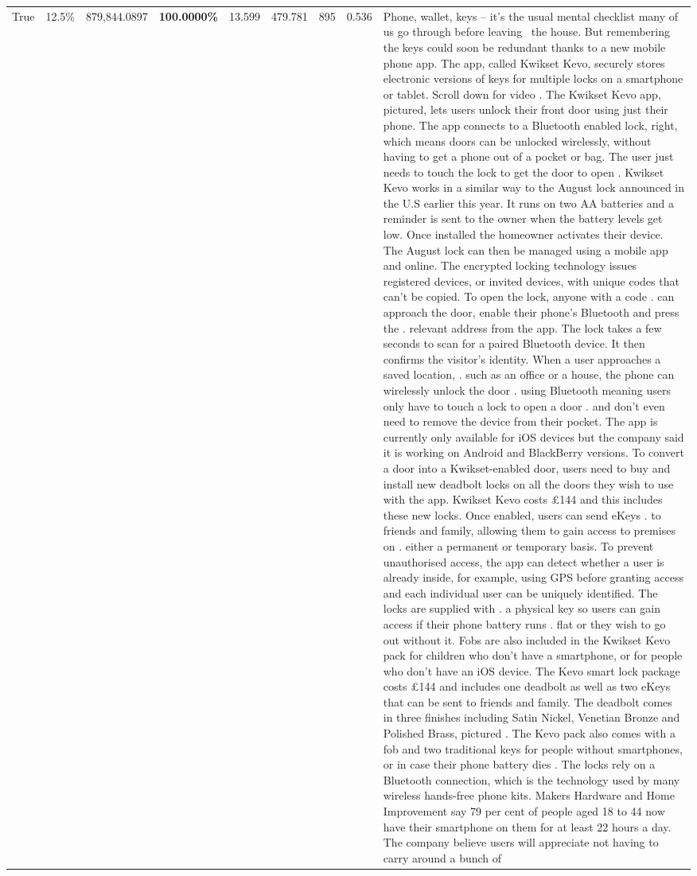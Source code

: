 \begin{table}[H]
\begin{tabular}{lllrlllll}
True & 12.5\% & 879,844.0897 & \bfseries \color{red} 100.0000\% & 13.599 & 479.781 & 895 & 0.536 & Phone, wallet, keys – it’s the usual mental checklist many of us go through before leaving  the house. But remembering the keys could soon be redundant thanks to a new mobile phone app. The app, called Kwikset Kevo, securely stores electronic versions of keys for multiple locks on a smartphone or tablet. Scroll down for video . The Kwikset Kevo app, pictured, lets users unlock their front door using just their phone. The app connects to a Bluetooth enabled lock, right, which means doors can be unlocked wirelessly, without having to get a phone out of a pocket or bag. The user just needs to touch the lock to get the door to open . Kwikset Kevo works in a similar way to the August lock announced in the U.S earlier this year. It runs on two AA batteries and a reminder is sent to the owner when the battery levels get low. Once installed the homeowner activates their device. The August lock can then be managed using a mobile app and online. The encrypted locking technology issues registered devices, or invited devices, with unique codes that can't be copied. To open the lock, anyone with a code . can approach the door, enable their phone's Bluetooth and press the . relevant address from the app. The lock takes a few seconds to scan for a paired Bluetooth device. It then confirms the visitor's identity. When a user approaches a saved location, . such as an office or a house, the phone can wirelessly unlock the door . using Bluetooth meaning users only have to touch a lock to open a door . and don't even need to remove the device from their pocket. The app is currently only available for iOS devices but the company said it is working on Android and BlackBerry versions. To convert a door into a Kwikset-enabled door, users need to buy and install new deadbolt locks on all the doors they wish to use with the app. Kwikset Kevo costs £144 and this includes these new locks. Once enabled, users can send eKeys . to friends and family, allowing them to gain access to premises on . either a permanent or temporary basis. To prevent unauthorised access, the app can detect whether a user is already inside, for example, using GPS before granting access and each individual user can be uniquely identified. The locks are supplied with . a physical key so users can gain access if their phone battery runs . flat or they wish to go out without it. Fobs are also included in the Kwikset Kevo pack for children who don't have a smartphone, or for people who don't have an iOS device. The Kevo smart lock package costs £144 and includes one deadbolt as well as two eKeys that can be sent to friends and family. The deadbolt comes in three finishes including Satin Nickel, Venetian Bronze and Polished Brass, pictured . The Kevo pack also comes with a fob and two traditional keys for people without smartphones, or in case their phone battery dies . The locks rely on a Bluetooth connection, which is the technology used by many wireless hands-free phone kits. Makers Hardware and Home Improvement say 79 per cent of people aged 18 to 44 now have their smartphone on them for at least 22 hours a day. The company believe users will appreciate not having to carry around a bunch of 
\end{tabular}
\end{table}

